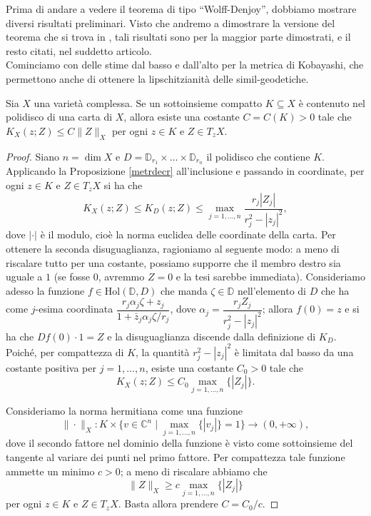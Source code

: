 Prima di andare a vedere il teorema di tipo ``Wolff-Denjoy'', dobbiamo mostrare diversi risultati preliminari. Visto che andremo a dimostrare la versione del teorema che si trova in \cite{CMS}, tali risultati sono per la maggior parte dimostrati, e il resto citati, nel suddetto articolo. \\

Cominciamo con delle stime dal basso e dall'alto per la metrica di Kobayashi, che permettono anche di ottenere la lipschitzianità delle simil-geodetiche.

\begin{lm} \label{polycpt}
    Sia $X$ una varietà complessa. Se un sottoinsieme compatto $K\subseteq X$ è contenuto nel polidisco di una carta di $X$, allora esiste una costante $C=C(K)>0$ tale che $K_X(z;Z) \le C\|Z\|_X$ per ogni $z \in K$ e $Z \in T_zX$.
\end{lm}

\begin{proof}
    Siano $n=\dim{X}$ e $D=\mathbb{D}_{r_1}\times\dots\times\mathbb{D}_{r_n}$ il polidisco che contiene $K$. Applicando la Proposizione \ref{metrdecr} all'inclusione e passando in coordinate, per ogni $z \in K$ e $Z \in T_zX$ si ha che
    $$K_X(z;Z) \le K_D(z;Z) \le \max_{j=1,\dots,n} \frac{r_j|Z_j|}{r_j^2-|z_j|^2},$$
    dove $|\cdot|$ è il modulo, cioè la norma euclidea delle coordinate della carta. Per ottenere la seconda disuguaglianza, ragioniamo al seguente modo: a meno di riscalare tutto per una costante, possiamo supporre che il membro destro sia uguale a $1$ (se fosse $0$, avremmo $Z=0$ e la tesi sarebbe immediata). Consideriamo adesso la funzione $f\in\text{Hol}(\mathbb{D},D)$ che manda $\zeta\in\mathbb{D}$ nell'elemento di $D$ che ha come $j$-esima coordinata $\dfrac{r_j\alpha_j\zeta+z_j}{1+\bar{z}_j\alpha_j\zeta/r_j}$, dove $\alpha_j=\dfrac{r_jZ_j}{r_j^2-|z_j|^2}$; allora $f(0)=z$ e si ha che $Df(0)\cdot 1=Z$ e la disuguaglianza discende dalla definizione di $K_D$. Poiché, per compattezza di $K$, la quantità $r_j^2-|z_j|^2$ è limitata dal basso da una costante positiva per $j=1,\dots,n$, esiste una costante $C_0>0$ tale che
    $$K_X(z;Z) \le C_0\max_{j=1,\dots,n}\{|Z_j|\}.$$
    
    
    Consideriamo la norma hermitiana come una funzione
    $$\|\cdot\|_X:K\times\big\{v\in\mathbb{C}^n\mid\max_{j=1,\dots,n}\{|v_j|\}=1\big\}\longrightarrow (0,+\infty),$$
    dove il secondo fattore nel dominio della funzione è visto come sottoinsieme del tangente al variare dei punti nel primo fattore. Per compattezza tale funzione ammette un minimo $c>0$; a meno di riscalare abbiamo che
    $$\|Z\|_X \ge c\max_{j=1,\dots,n}\{|Z_j|\}$$
    per ogni $z\in K$ e $Z\in T_zX$. Basta allora prendere $C=C_0/c$.
\end{proof}

